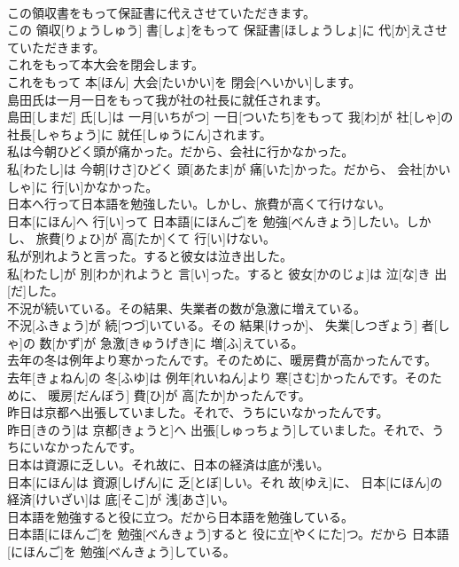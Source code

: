 \documentclass[8pt]{extreport}
\begin{document}
\begin{CJK}{UTF8}{min}
\\	この領収書をもって保証書に代えさせていただきます。	
\\	この 領収[りょうしゅう] 書[しょ]をもって 保証書[ほしょうしょ]に 代[か]えさせていただきます。
\\	これをもって本大会を閉会します。	
\\	これをもって 本[ほん] 大会[たいかい]を 閉会[へいかい]します。
\\	島田氏は一月一日をもって我が社の社長に就任されます。	
\\	島田[しまだ] 氏[し]は 一月[いちがつ] 一日[ついたち]をもって 我[わ]が 社[しゃ]の 社長[しゃちょう]に 就任[しゅうにん]されます。
\\	私は今朝ひどく頭が痛かった。だから、会社に行かなかった。	
\\	私[わたし]は 今朝[けさ]ひどく 頭[あたま]が 痛[いた]かった。だから、 会社[かいしゃ]に 行[い]かなかった。
\\	日本へ行って日本語を勉強したい。しかし、旅費が高くて行けない。	
\\	日本[にほん]へ 行[い]って 日本語[にほんご]を 勉強[べんきょう]したい。しかし、 旅費[りょひ]が 高[たか]くて 行[い]けない。
\\	私が別れようと言った。すると彼女は泣き出した。	
\\	私[わたし]が 別[わか]れようと 言[い]った。すると 彼女[かのじょ]は 泣[な]き 出[だ]した。
\\	不況が続いている。その結果、失業者の数が急激に増えている。	
\\	不況[ふきょう]が 続[つづ]いている。その 結果[けっか]、 失業[しつぎょう] 者[しゃ]の 数[かず]が 急激[きゅうげき]に 増[ふ]えている。
\\	去年の冬は例年より寒かったんです。そのために、暖房費が高かったんです。	
\\	去年[きょねん]の 冬[ふゆ]は 例年[れいねん]より 寒[さむ]かったんです。そのために、 暖房[だんぼう] 費[ひ]が 高[たか]かったんです。
\\	昨日は京都へ出張していました。それで、うちにいなかったんです。	
\\	昨日[きのう]は 京都[きょうと]へ 出張[しゅっちょう]していました。それで、うちにいなかったんです。
\\	日本は資源に乏しい。それ故に、日本の経済は底が浅い。	
\\	日本[にほん]は 資源[しげん]に 乏[とぼ]しい。それ 故[ゆえ]に、 日本[にほん]の 経済[けいざい]は 底[そこ]が 浅[あさ]い。
\\	日本語を勉強すると役に立つ。だから日本語を勉強している。	
\\	日本語[にほんご]を 勉強[べんきょう]すると 役に立[やくにた]つ。だから 日本語[にほんご]を 勉強[べんきょう]している。

\end{CJK}
\end{document}
